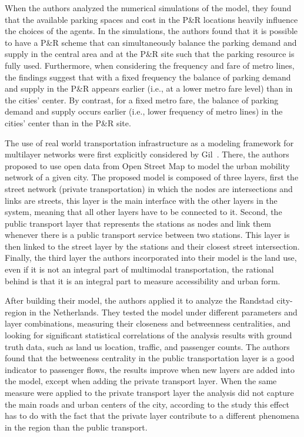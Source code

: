When the authors analyzed the numerical simulations of the model, they found that the available parking spaces and cost in the P\&R locations heavily influence the choices of the agents. In the simulations, the authors found that it is possible to have a P\&R scheme that can simultaneously balance the parking demand and supply in the central area and at the P\&R site such that the parking resource is fully used. Furthermore, when considering the frequency and fare of metro lines, the findings suggest that with a fixed frequency the balance of parking demand and supply in the P\&R appears earlier (i.e., at a lower metro fare level) than in the cities' center. By contrast, for a fixed metro fare, the balance of parking demand and supply occurs earlier (i.e., lower frequency of metro lines) in the cities' center than in the P\&R site. 

The use of real world transportation infrastructure as a modeling framework for multilayer networks were first explicitly considered  by Gil~\cite{gil2014configuration}. There, the authors proposed to use open data from Open Street Map to model the urban mobility network of a given city. The proposed model is composed of three layers, first the street network (private transportation) in which the nodes are intersections and links are streets, this layer is the main interface with the other layers in the system, meaning that all other layers have to be connected to it. Second, the public transport layer that represents the stations as nodes and link them whenever there is a public transport service between two stations. This layer is then linked to the street layer by the stations and their closest street intersection. Finally, the third layer the authors incorporated into their model is the land use, even if it is not an integral part of multimodal transportation, the rational behind is that it is an integral part to measure accessibility and urban form.

After building their model, the authors applied it to analyze the Randstad city-region in the Netherlands. They tested the model under different parameters and layer combinations, measuring their closeness and betweenness centralities, and looking for significant statistical correlations of the analysis results with ground truth data, such as land us location, traffic, and passenger counts. The authors found that the betweeness centrality in the public transportation layer is a good indicator to passenger flows, the results improve when new layers are added into the model, except when adding the private transport layer. When the same measure were applied to the private transport layer the analysis did not capture the main roads and urban centers of the city, according to the study this effect has to do with the fact that the private layer contribute to a different phenomena in the region than the public transport.

